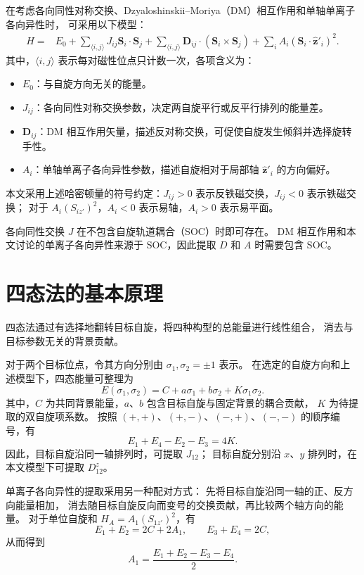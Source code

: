 \documentclass[openany]{book}
\theoremstyle{mydefinition}
\theoremstyle{myplain}
\begin{document}
在考虑各向同性对称交换、Dzyaloshinskii--Moriya（DM）相互作用和单轴单离子各向异性时，
可采用以下模型：
\[
\begin{aligned}
H={}&E_0+\sum_{\langle i,j\rangle}J_{ij}\mathbf S_i\cdot\mathbf S_j
+\sum_{\langle i,j\rangle}\mathbf D_{ij}\cdot(\mathbf S_i\times\mathbf S_j)+\sum_i A_i(\mathbf S_i\cdot\hat{\mathbf z}'_i)^2.
\end{aligned}
\]
其中，\(\langle i,j\rangle\) 表示每对磁性位点只计数一次，各项含义为：
\begin{itemize}
    \item \(E_0\)：与自旋方向无关的能量。
    \item \(J_{ij}\)：各向同性对称交换参数，决定两自旋平行或反平行排列的能量差。
    \item \(\mathbf D_{ij}\)：DM 相互作用矢量，描述反对称交换，可促使自旋发生倾斜并选择旋转手性。
    \item \(A_i\)：单轴单离子各向异性参数，描述自旋相对于局部轴 \(\hat{\mathbf z}'_i\) 的方向偏好。
\end{itemize}

本文采用上述哈密顿量的符号约定：\(J_{ij}>0\) 表示反铁磁交换，\(J_{ij}<0\) 表示铁磁交换；
对于 \(A_i(S_{iz'})^2\)，\(A_i<0\) 表示易轴，\(A_i>0\) 表示易平面。

各向同性交换 \(J\) 在不包含自旋轨道耦合（SOC）时即可存在。
DM 相互作用和本文讨论的单离子各向异性来源于 SOC，因此提取 \(D\) 和 \(A\) 时需要包含 SOC。

\section{四态法的基本原理}

四态法通过有选择地翻转目标自旋，将四种构型的总能量进行线性组合，
消去与目标参数无关的背景贡献。

对于两个目标位点，令其方向分别由 \(\sigma_1,\sigma_2=\pm1\) 表示。
在选定的自旋方向和上述模型下，四态能量可整理为
\[
E(\sigma_1,\sigma_2)=C+a\sigma_1+b\sigma_2+K\sigma_1\sigma_2.
\]
其中，\(C\) 为共同背景能量，\(a\)、\(b\) 包含目标自旋与固定背景的耦合贡献，
\(K\) 为待提取的双自旋项系数。
按照 \((+,+)\)、\((+,-)\)、\((-,+)\)、\((-,-)\) 的顺序编号，有
\[
E_1+E_4-E_2-E_3=4K.
\]
因此，目标自旋沿同一轴排列时，可提取 \(J_{12}\)；
目标自旋分别沿 \(x\)、\(y\) 排列时，在本文模型下可提取 \(D_{12}^{z}\)。

单离子各向异性的提取采用另一种配对方式：
先将目标自旋沿同一轴的正、反方向能量相加，
消去随目标自旋反向而变号的交换贡献，再比较两个轴方向的能量。
对于单位自旋和 \(H_A=A_1(S_{1z'})^2\)，有
\[
E_1+E_2=2C+2A_1,\qquad E_3+E_4=2C,
\]
从而得到
\[
A_1=\frac{E_1+E_2-E_3-E_4}{2}.
\]
\end{document}
